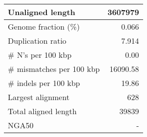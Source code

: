 \documentclass[12pt,a4paper]{article}
\begin{document}
\begin{table}[ht]
\begin{center}
\begin{tabular}{|l*{1}{|r}|}
Unaligned length & 3607979 \\ \hline
Genome fraction (\%) & 0.066 \\ \hline
Duplication ratio & 7.914 \\ \hline
\# N's per 100 kbp & 0.00 \\ \hline
\# mismatches per 100 kbp & 16090.58 \\ \hline
\# indels per 100 kbp & 19.86 \\ \hline
Largest alignment & 628 \\ \hline
Total aligned length & 39839 \\ \hline
NGA50 & - \\ \hline
\end{tabular}
\end{center}
\end{table}
\end{document}
